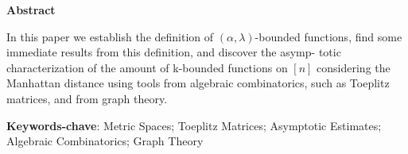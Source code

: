 \begin{center}
  \large \textbf{Abstract}
\end{center}
\vspace{1cm}
\par In this paper we establish the definition of $(\alpha, \lambda)$-bounded functions,
find some immediate results from this definition, and discover the asymp-
totic characterization of the amount of k-bounded functions on \([n]\) considering the Manhattan distance using tools from algebraic combinatorics, such as Toeplitz matrices, and from graph theory.

\vspace{1cm}

\begin{raggedleft}
  \textbf{Keywords-chave}: Metric Spaces; Toeplitz Matrices; Asymptotic Estimates;
  Algebraic Combinatorics; Graph Theory
\end{raggedleft}
\newpage
